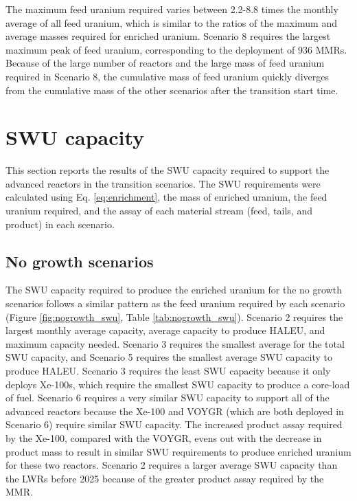 The maximum feed uranium required varies between 2.2-8.8 times the monthly 
average of all feed uranium, which is similar to the ratios of the 
maximum and average masses required for enriched uranium. Scenario 8 
requires the largest maximum peak of 
feed uranium, corresponding to the deployment of 936 \glspl{MMR}. Because 
of 
the large number of reactors and the large mass of feed uranium required 
in Scenario 8, the cumulative mass of feed uranium quickly diverges from 
the cumulative mass of the other scenarios after the transition start time. 

\section{SWU capacity}
This section reports the results of the \gls{SWU} capacity 
required to support the advanced reactors in the transition 
scenarios. The \gls{SWU} requirements were calculated using 
Eq. \ref{eq:enrichment},  
the mass of enriched uranium, the feed uranium required, 
and the assay of each material stream (feed, tails, and product)
in each scenario. 

\subsection{No growth scenarios} \label{sec:nogrowth_swu}
The \gls{SWU} capacity required to produce the enriched uranium for 
the no growth scenarios follows a similar pattern as 
the feed uranium required by each scenario (Figure \ref{fig:nogrowth_swu}, 
Table \ref{tab:nogrowth_swu}). Scenario 2 requires the largest monthly 
average capacity, average capacity to produce \gls{HALEU}, and maximum 
capacity needed. Scenario 3 requires the smallest average for the total 
\gls{SWU} capacity, 
and Scenario 5 requires the smallest average 
\gls{SWU} capacity to produce \gls{HALEU}. Scenario 3 requires the least 
\gls{SWU} capacity because it only deploys Xe-100s, which require the 
smallest \gls{SWU} capacity to produce a core-load of fuel. Scenario 
6 requires a very similar \gls{SWU} capacity to support all of the 
advanced reactors because the Xe-100 and VOYGR (which are both deployed 
in Scenario 6) require similar \gls{SWU} capacity. The increased 
product assay required by the Xe-100, compared with the VOYGR, evens 
out with the decrease in product mass to result in similar \gls{SWU} 
requirements to produce enriched uranium for these two reactors. 
Scenario 2 requires a larger average \gls{SWU} capacity 
than the \glspl{LWR} before 2025 because of the greater product 
assay required by the \gls{MMR}. 

